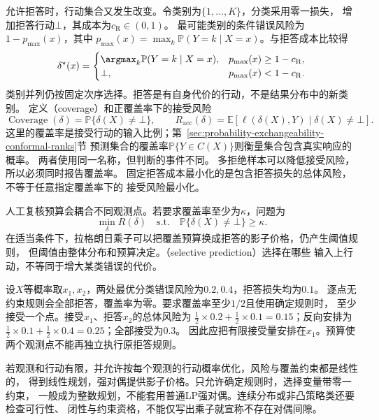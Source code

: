 允许拒答时，行动集合又发生改变。令类别为$\{1,\ldots,K\}$，分类采用零一损失，
增加拒答行动$\bot$，其成本为$c_{\mathrm R}\in(0,1)$。
最可能类别的条件错误风险为$1-p_{\max}(x)$，其中
$p_{\max}(x)=\max_k\mathbb P(Y=k\mid X=x)$。与拒答成本比较得
\begin{equation}
  \delta^\star(x)=
  \begin{cases}
    \argmax_k\mathbb P(Y=k\mid X=x),&p_{\max}(x)\geq1-c_{\mathrm R},\\
    \bot,&p_{\max}(x)<1-c_{\mathrm R}.
  \end{cases}
  \label{eq:decision-reject-rule}
\end{equation}
类别并列仍按固定次序选择。拒答是有自身代价的行动，不是结果分布中的新类别。
定义（coverage）和正覆盖率下的接受风险
\[
  \operatorname{Coverage}(\delta)=\mathbb P\{\delta(X)\neq\bot\},\qquad
  R_{\mathrm{acc}}(\delta)
  =\mathbb E[\ell(\delta(X),Y)\mid\delta(X)\neq\bot].
\]
这里的覆盖率是接受行动的输入比例；第~\ref{sec:probability-exchangeability-conformal-ranks}节
预测集合的覆盖率$\mathbb P\{Y\in C(X)\}$则衡量集合包含真实响应的概率。
两者使用同一名称，但判断的事件不同。
多拒绝样本可以降低接受风险，所以必须同时报告覆盖率。
固定拒答成本最小化的是包含拒答损失的总体风险，不等于任意指定覆盖率下的
接受风险最小化。

人工复核预算会耦合不同观测点。若要求覆盖率至少为$\kappa$，问题为
\[
  \min_\delta R(\delta)
  \quad\text{s.t.}\quad\mathbb P\{\delta(X)\neq\bot\}\geq\kappa.
\]
在适当条件下，拉格朗日乘子可以把覆盖预算换成拒答的影子价格，仍产生阈值规则，
但阈值由整体分布和预算决定。（selective prediction）选择在哪些
输入上行动，不等同于增大某类错误的代价。

\begin{example}[覆盖预算耦合两个观测点]
\label{ex:decision-two-point-coverage-budget}
设$X$等概率取$x_1,x_2$，两处最优分类错误风险为$0.2,0.4$，拒答损失均为$0.1$。
逐点无约束规则会全部拒答，覆盖率为零。要求覆盖率至少$1/2$且使用确定规则时，
至少接受一个点。接受$x_1$、拒答$x_2$的总体风险为
$\tfrac12\times0.2+\tfrac12\times0.1=0.15$；反向安排为
$\tfrac12\times0.1+\tfrac12\times0.4=0.25$；全部接受为$0.3$。
因此应把有限接受量安排在$x_1$。预算使两个观测点不能再独立执行原拒答规则。
\end{example}

若观测和行动有限，并允许按每个观测的行动概率优化，风险与覆盖约束都是线性的，
得到线性规划，强对偶提供影子价格。只允许确定规则时，选择变量带零一约束，
一般成为整数规划，不能套用普通LP强对偶。连续分布或非凸策略类还要检查可行性、
闭性与约束资格，不能仅写出乘子就宣称不存在对偶间隙。

